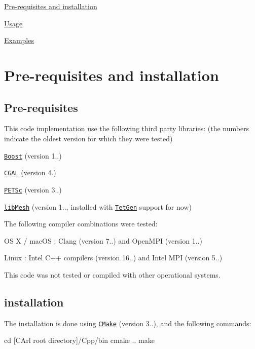 
\begin{DoxyItemize}
\item \hyperlink{cpp_installation}{Pre-\/requisites and installation}
\item \hyperlink{cpp_usage}{Usage}
\item \hyperlink{cpp_examples}{Examples} 
\end{DoxyItemize}\hypertarget{cpp_installation}{}\section{Pre-\/requisites and installation}\label{cpp_installation}
\hypertarget{cpp_installation_Pre-requisites}{}\subsection{Pre-\/requisites}\label{cpp_installation_Pre-requisites}
This code implementation use the following third party libraries\+: (the numbers indicate the oldest version for which they were tested)


\begin{DoxyEnumerate}
\item \href{http://www.boost.org}{\tt Boost} (version 1..)
\item \href{http://www.cgal.org}{\tt C\+G\+A\+L} (version 4.)
\item \href{http://www.mcs.anl.gov/petsc/}{\tt P\+E\+T\+Sc} (version 3..)
\item \href{https://libmesh.github.io}{\tt lib\+Mesh} (version 1.., installed with \href{http://wias-berlin.de/software/tetgen/}{\tt Tet\+Gen} support for now)
\end{DoxyEnumerate}

The following compiler combinations were tested\+:


\begin{DoxyEnumerate}
\item O\+S X / mac\+O\+S \+: Clang (version 7..) and Open\+M\+P\+I (version 1..)
\item Linux \+: Intel C++ compilers (version 16..) and Intel M\+P\+I (version 5..)
\end{DoxyEnumerate}

This code was not tested or compiled with other operational systems.\hypertarget{cpp_installation_installation}{}\subsection{installation}\label{cpp_installation_installation}
The installation is done using \href{https://cmake.org}{\tt C\+Make} (version 3..), and the following commands\+: \begin{DoxyVerb}cd [CArl root directory]/Cpp/bin
cmake ..
make
\end{DoxyVerb}


